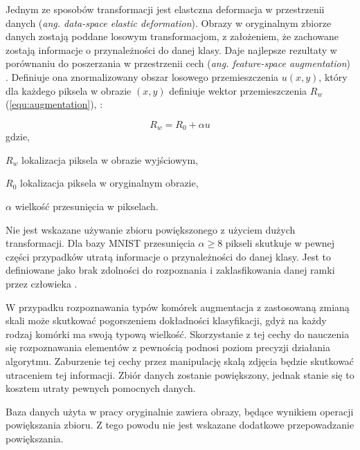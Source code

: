 {\parindent0pt %
Jednym ze sposobów transformacji jest elastczna deformacja w przestrzenii danych (\textit{ang. data-space elastic deformation}). Obrazy w oryginalnym zbiorze danych zostają poddane losowym transformacjom, z założeniem, że zachowane zostają informacje o przynależności do danej klasy. Daje najlepsze rezultaty w porównaniu do poszerzania w przestrzenii cech (\textit{ang. feature-space augmentation}) \cite{Wong2016UnderstandingDA}. Definiuje ona znormalizowany obszar losowego przemieszczenia \(u(x,y)\), który dla każdego piksela w obrazie \((x,y)\) definiuje wektor przemieszczenia \(R_w\) (\ref{equ:augmentation}), \cite{Wong2016UnderstandingDA}:

\begin{equation}
R_w = R_0 + \alpha u
\label{equ:augmentation}
\end{equation}
gdzie,
\begin{eqwhere}[2cm]
	\item[$R_w$] lokalizacja piksela w obrazie wyjściowym,
	\item[$R_0$] lokalizacja piksela w oryginalnym obrazie,
	\item[$\alpha$] wielkość przesunięcia w pikselach.
\end{eqwhere}

Nie jest wskazane używanie zbioru powiększonego z użyciem dużych transformacji. Dla bazy MNIST przesunięcia \( \alpha \geq 8 \)  pikseli skutkuje w pewnej części przypadków utratą informacje o przynależności do danej klasy. Jest to definiowane jako brak zdolności do rozpoznania i zaklasfikowania danej ramki przez człowieka \cite{Wong2016UnderstandingDA}.

W przypadku rozpoznawania typów komórek augmentacja z zastosowaną zmianą skali może skutkować pogorszeniem dokładności klasyfikacji, gdyż na każdy rodzaj komórki ma swoją typową wielkość. Skorzystanie z tej cechy do nauczenia się rozpoznawania elementów z pewnością podnosi poziom precyzji działania algorytmu. Zaburzenie tej cechy przez manipulację skalą zdjęcia będzie skutkować utraceniem tej informacji. Zbiór danych zostanie powiększony, jednak stanie się to kosztem utraty pewnych pomocnych danych.

Baza danych użyta w pracy oryginalnie zawiera obrazy, będące wynikiem operacji powiększania zbioru. Z tego powodu nie jest wskazane dodatkowe przepowadzanie powiększania.
}

